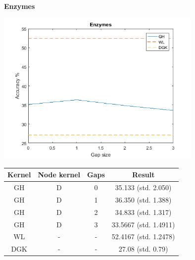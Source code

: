 \documentclass{article}
\begin{document}
\textbf{Enzymes}\\
\begin{minipage}{0.6\linewidth}
	\hspace*{-1in}
	\includegraphics[width=10cm]{enzymes}
	\label{fig:enzymes}
\end{minipage}
\begin{minipage}[c]{0.5\linewidth}
	
	\centering
	\begin{tabular}{c|c|c|c}
		Kernel & Node kernel & Gaps & Result\\
		\hline
		GH & D & 0 & 35.133 (std. 2.050)\\
		GH & D & 1 & 36.350 (std. 1.388)\\
		GH & D & 2 & 34.833 (std. 1.317)\\
		GH & D & 3 & 33.5667 (std. 1.4911)\\
		WL & - & - & 52.4167 (std. 1.2478)\\
		DGK & - & - & 27.08 (std. 0.79)
	\end{tabular}
	\label{table:enzymes}
\end{minipage}
\end{document}
